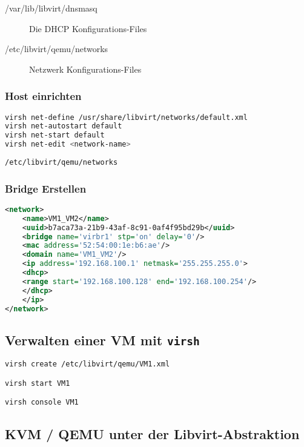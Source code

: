 \begin{description}
	\item[/var/lib/libvirt/dnsmasq] Die DHCP Konfigurations-Files 
	\item[/etc/libvirt/qemu/networks] Netzwerk Konfigurations-Files
\end{description}

\subsubsection{Host einrichten}
\begin{lstlisting}[language=bash]
virsh net-define /usr/share/libvirt/networks/default.xml
virsh net-autostart default
virsh net-start default
virsh net-edit <network-name>
\end{lstlisting}


\lstinline|/etc/libvirt/qemu/networks|

\subsubsection{Bridge Erstellen}
\begin{lstlisting}[language=xml]
<network>
	<name>VM1_VM2</name>
	<uuid>b7aca73a-21b9-43af-8c91-0af4f95bd29b</uuid>
	<bridge name='virbr1' stp='on' delay='0'/>
	<mac address='52:54:00:1e:b6:ae'/>
	<domain name='VM1_VM2'/>
	<ip address='192.168.100.1' netmask='255.255.255.0'>
	<dhcp>
	<range start='192.168.100.128' end='192.168.100.254'/>
	</dhcp>
	</ip>
</network>
\end{lstlisting}

\subsection{Verwalten einer VM mit \lstinline|virsh|}


\begin{lstlisting}[language=bash]
virsh create /etc/libvirt/qemu/VM1.xml

virsh start VM1 

virsh console VM1
\end{lstlisting}

\subsection{KVM / QEMU unter der Libvirt-Abstraktion}



